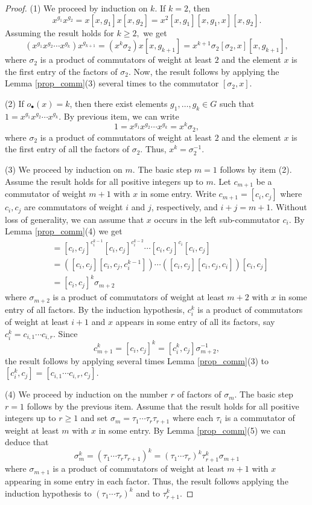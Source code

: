 \documentclass[12pt,leqno]{amsart}
\theoremstyle{definition}
\begin{document}
\begin{proof}
(1) We proceed by induction on $k.$ If $k=2$, then 
$$x^{g_1}x^{g_2}=x[x,g_1]x[x,g_2]=x^2[x,g_1][x,g_1,x][x,g_2].$$ Assuming the result holds for $k\geq 2,$ we get 
$$(x^{g_1}x^{g_2}\cdots x^{g_k})x^{g_{k+1}}=(x^k\sigma_2)x[x,g_{k+1}]=x^{k+1}\sigma_2[\sigma_2,x][x,g_{k+1}],$$ where $\sigma_2$ is a product of commutators of weight at least $2$ and the element $x$ is the first entry of the factors of $\sigma_2$. 
Now, the result follows by applying the Lemma \ref{prop_comm}(3) several times to the commutator $[\sigma_2,x]$.

(2)  If $o_{\bullet}(x)=k$, then there exist elements $g_1,\ldots, g_k\in G$ such that   $1=x^{g_1}x^{g_2}\cdots x^{g_k}$. By previous item, we can write $$1=x^{g_1}x^{g_2}\cdots x^{g_k}=x^k\sigma_2,$$ 
where $\sigma_2$ is a product of commutators of weight at least $2$ and the element $x$ is the first entry of all the factors of $\sigma_2$. Thus, $x^k=\sigma_2^{-1}$.

(3)  We proceed by induction on $m$. The basic step $m=1$ follows by item (2). Assume the result holds for all positive integers up to $m$. Let $c_{m+1}$ be a commutator of weight $m+1$ with $x$ in some entry.  Write $c_{m+1}=[c_i,c_j]$ where $c_i, c_j$ are commutators of weight $i$ and $j$, respectively, and $i+j=m+1.$ Without loss of generality, we can assume that $x$ occurs in the left sub-commutator $c_i$. By Lemma \ref{prop_comm}(4) we get
\begin{align*}
   [c_i^k,c_j]& =    [c_i,c_j]^{c_i^{k-1}}[c_i,c_j]^{c_i^{k-2}}\cdots [c_i,c_j]^{c_i}[c_i,c_j]\\
    & =    ([c_i,c_j][c_i,c_j,c_i^{k-1}])
    \cdots ([c_i,c_j][c_i,c_j,c_i])[c_i,c_j]\\
    & =  [c_i,c_j]^k\sigma_{m+2}
\end{align*}
where $\sigma_{m+2}$ is a product of commutators of weight at least $m+2$ with $x$ in some entry of all factors. By the induction hypothesis, $c_i^k$ is a product of commutators of weight at least $i+1$  and $x$ appears in some entry of all its factors, say $c_i^k=c_{i,1}\cdots c_{i,r}$. Since 
\[
c_{m+1}^k=[c_i,c_j]^k=[c_i^k,c_j]\sigma_{m+2}^{-1},
\]
the result follows by applying several times Lemma \ref{prop_comm}(3) to $[c_i^k,c_j]=[c_{i,1}\cdots c_{i,r},c_j]$.


(4) We proceed by induction on the number $r$ of factors of $\sigma_m$. The basic step $r=1$ follows by the previous item. Assume that the result holds for all positive integers up to $r\geq 1$ and set $\sigma_m=\tau_1\cdots\tau_r\tau_{r+1}$ where each $\tau_i$ is a commutator of weight at least $m$ with $x$ in some entry. By Lemma \ref{prop_comm}(5) we can deduce that 
$$\sigma_m^k=(\tau_1\cdots\tau_r\tau_{r+1})^k=(\tau_1\cdots\tau_r)^k\tau_{r+1}^k\sigma_{m+1}$$
where $\sigma_{m+1}$ is a product of commutators of weight at least $m+1$ with $x$ appearing in some entry in each factor. Thus, the result follows applying the induction hypothesis to $(\tau_1\cdots\tau_r)^k$ and to $\tau_{r+1}^k$. 


\end{proof}
\end{document}
